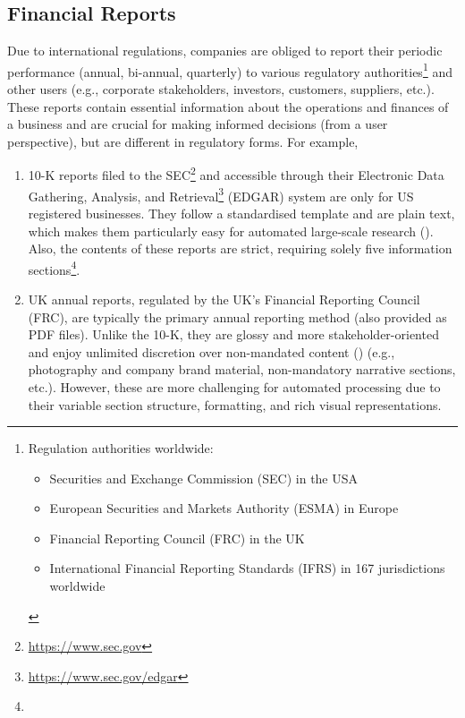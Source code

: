 \subsection{Financial Reports} \label{subsec:financial_reports}
Due to international regulations, companies are obliged to report their periodic performance (annual, bi-annual, quarterly) to various regulatory authorities\footnote{Regulation authorities worldwide:
    \begin{itemize}
        \item Securities and Exchange Commission (SEC) in the USA
        \item European Securities and Markets Authority (ESMA) in Europe
        \item Financial Reporting Council (FRC) in the UK
        \item International Financial Reporting Standards (IFRS) in 167 jurisdictions worldwide
    \end{itemize}
    } and other users (e.g., corporate stakeholders, investors, customers, suppliers, etc.).
    These reports contain essential information about the operations and finances of a business and are crucial for making informed decisions (from a user perspective), but are different in regulatory forms.
    For example,
\begin{enumerate}
    \item 10-K reports filed to the SEC\footnote{\url{https://www.sec.gov}} and accessible through their Electronic Data Gathering, Analysis, and Retrieval\footnote{\url{https://www.sec.gov/edgar}} (EDGAR) system are only for US registered businesses.
    They follow a standardised template and are plain text, which makes them particularly easy for automated large-scale research (\cite{el-haj2019retrieving}).
    Also, the contents of these reports are strict, requiring solely five information sections\footnote{
    }.
    \item UK annual reports, regulated by the UK's Financial Reporting Council (FRC), are typically the primary annual reporting method (also provided as PDF files).
    Unlike the 10-K, they are glossy and more stakeholder-oriented and enjoy unlimited discretion over non-mandated content (\cite{el-haj2019retrieving}) (e.g., photography and company brand material, non-mandatory narrative sections, etc.).
    However, these are more challenging for automated processing due to their variable section structure, formatting, and rich visual representations.
\end{enumerate}

